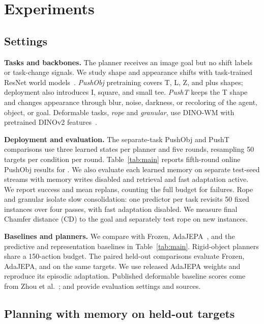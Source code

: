 \section{Experiments}
\label{sec:experiments}

\subsection{Settings}
\label{sec:setup}

\noindent \textbf{Tasks and backbones.}
The planner receives an image goal but no shift labels or task-change signals. We study shape and appearance shifts with task-trained ResNet world models~\cite{he2016resnet}. \emph{PushObj} pretraining covers T, L, Z, and plus shapes; deployment also introduces I, square, and small tee. \emph{PushT} keeps the T shape and changes appearance through blur, noise, darkness, or recoloring of the agent, object, or goal. Deformable tasks, \emph{rope} and \emph{granular}, use DINO-WM with pretrained DINOv2 features~\cite{zhou2024dinowm,oquab2024dinov2,lin2020softgym}.

\vspace{1mm}
\noindent \textbf{Deployment and evaluation.}
The separate-task PushObj and PushT comparisons use three learned states per planner and five rounds, resampling 50 targets per condition per round. Table~\ref{tab:main} reports fifth-round online PushObj results for \ours. We also evaluate each learned memory on separate test-seed streams with memory writes disabled and retrieval and fast adaptation active. We report success and mean replans, counting the full budget for failures. Rope and granular isolate slow consolidation: one predictor per task revisits 50 fixed instances over four passes, with fast adaptation disabled. We measure final Chamfer distance (CD) to the goal and separately test rope on new instances.

\vspace{1mm}
\noindent \textbf{Baselines and planners.}
We compare with Frozen, AdaJEPA~\cite{wang2026adajepa}, and the predictive and representation baselines in Table~\ref{tab:main}. Rigid-object planners share a 150-action budget. The paired held-out comparisons evaluate Frozen, AdaJEPA, and \ours on the same targets. We use released AdaJEPA weights and reproduce its episodic adaptation. Published deformable baseline scores come from Zhou et al.~\cite{zhou2024dinowm};  and  provide evaluation settings and sources.

\subsection{Planning with memory on held-out targets}
\label{sec:sota}


